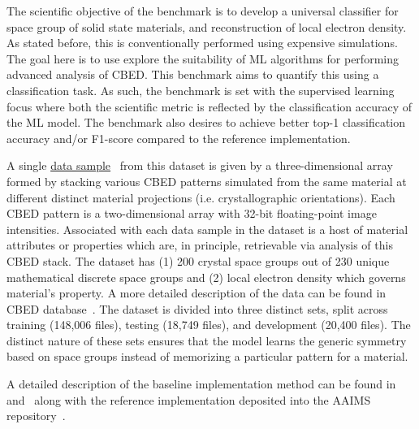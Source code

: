  The scientific objective of the benchmark is to develop a universal classifier for space group of solid state materials, and  reconstruction of local electron density. As stated before, this is conventionally performed using expensive simulations. The goal here is to use explore the suitability of ML algorithms for performing advanced analysis of CBED. This benchmark aims to quantify this using a classification task. As such, the benchmark is set with the supervised learning focus where both the scientific metric is reflected by the classification accuracy of the ML model. The benchmark also desires to achieve better top-1 classification accuracy and/or F1-score compared to the reference implementation.

\smallskip

 A single \href{https://doi.ccs.ornl.gov/ui/doi/70}{data sample}~\cite{laanait-scanning}
from this dataset is given by a three-dimensional array formed by stacking various CBED patterns simulated from the same material at different distinct material projections (i.e. crystallographic orientations). Each CBED pattern is a two-dimensional array with 32-bit floating-point image intensities. Associated with each data sample in the dataset is a host of material attributes or properties which are, in principle, retrievable via analysis of this CBED stack. The dataset has (1) 200 crystal space groups out of 230 unique mathematical discrete space groups and (2) local electron density which governs material's property. A more detailed description of the data can be found in CBED database~\cite{laanait-scanning}. The dataset is divided into three distinct sets, split across training (148,006 files), testing (18,749 files), and development (20,400 files). The distinct nature of these sets ensures that the model learns the generic symmetry based on space groups instead of memorizing a particular pattern for a material.

\smallskip

 A detailed description of the baseline implementation method can be found in~\cite{pan-20} and~\cite{laanait-ms-19} along with the reference
implementation deposited into the AAIMS repository~\cite{stemdl-benchmark}.



